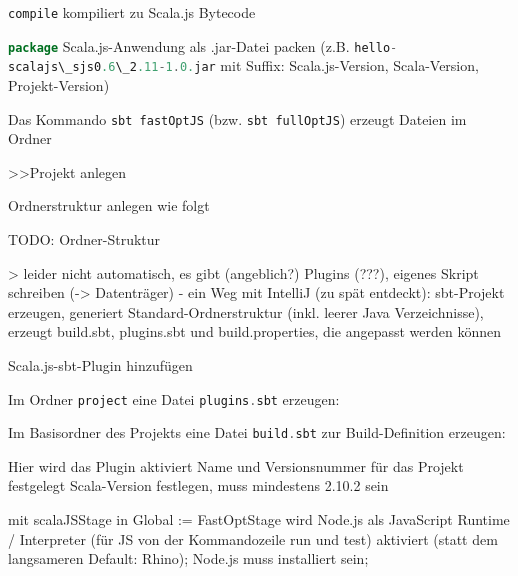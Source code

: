 \documentclass[a4paper, 12pt, hidelinks, listof=totoc, listoftables=totoc, bibliography=totoc]{scrreprt}
\newcommand{\code}[1]{\lstinline[language=Scala, style=inline]|#1|}
\begin{document}
\code{compile} kompiliert zu Scala.js Bytecode

\code{package} Scala.js-Anwendung als .jar-Datei packen (z.B. \code{hello-scalajs\_sjs0.6\_2.11-1.0.jar} mit Suffix: Scala.js-Version, Scala-Version, Projekt-Version)






Das Kommando \code{sbt fastOptJS} (bzw. \code{sbt fullOptJS}) erzeugt Dateien im Ordner
















>>Projekt anlegen


Ordnerstruktur anlegen wie folgt

TODO: Ordner-Struktur

> leider nicht automatisch, es gibt (angeblich?) Plugins (???), eigenes Skript schreiben (-> Datenträger)
	- ein Weg mit IntelliJ (zu spät entdeckt): sbt-Projekt erzeugen, generiert Standard-Ordnerstruktur (inkl. leerer Java Verzeichnisse), erzeugt build.sbt, plugins.sbt und build.properties, die angepasst werden können


Scala.js-sbt-Plugin hinzufügen

Im Ordner \code{project} eine Datei \code{plugins.sbt} erzeugen:


Im Basisordner des Projekts eine Datei \code{build.sbt} zur Build-Definition erzeugen:


Hier wird das Plugin aktiviert
Name und Versionsnummer für das Projekt festgelegt
Scala-Version festlegen, muss mindestens 2.10.2 sein

mit scalaJSStage in Global := FastOptStage wird Node.js als JavaScript Runtime / Interpreter (für JS von der Kommandozeile run und test) aktiviert (statt dem langsameren Default: Rhino); Node.js muss installiert sein;
\end{document}
